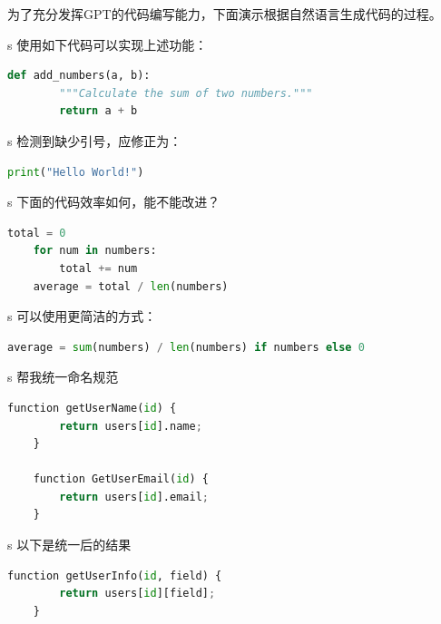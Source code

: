 为了充分发挥GPT的代码编写能力，下面演示根据自然语言生成代码的过程。


\begin{gptbox}
s \footnotesize{使用如下代码可以实现上述功能：}
\small{
\begin{lstlisting}[language=Python]
    def add_numbers(a, b):
        """Calculate the sum of two numbers."""
        return a + b
\end{lstlisting}
}
\end{gptbox}


\begin{gptbox}
s \footnotesize{检测到缺少引号，应修正为：}
\small{
\begin{lstlisting}[language=Python]
    print("Hello World!")
\end{lstlisting}
}
\end{gptbox}


\begin{promptbox}
s \footnotesize{下面的代码效率如何，能不能改进？}
\small{
\begin{lstlisting}[language=Python]
    total = 0
    for num in numbers:
        total += num
    average = total / len(numbers)
\end{lstlisting}}
\end{promptbox}

\begin{gptbox}
s \footnotesize{可以使用更简洁的方式：}
\small{
\begin{lstlisting}[language=Python]
    average = sum(numbers) / len(numbers) if numbers else 0
\end{lstlisting}
}
\end{gptbox}



\begin{promptbox}
s \footnotesize{帮我统一命名规范}
\small{
\begin{lstlisting}[language=Python]
    function getUserName(id) {
        return users[id].name;
    }
    
    function GetUserEmail(id) {
        return users[id].email;
    }
\end{lstlisting}}
\end{promptbox}

\begin{gptbox}
s \footnotesize{以下是统一后的结果}
\small{
\begin{lstlisting}[language=Python]
    function getUserInfo(id, field) {
        return users[id][field];
    }
\end{lstlisting}
}
\end{gptbox}

